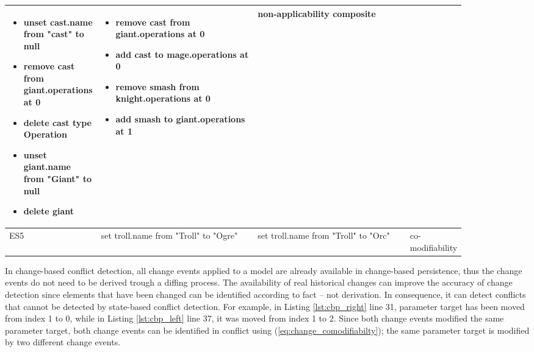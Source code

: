 \begin{table*}[ht]
\begin{scriptsize}
\begin{tabular}{|p{0.04\linewidth}|p{0.36\linewidth}|p{0.36\linewidth}|
        p{0.11\linewidth}|}
\begin{minipage}[t]{\linewidth}
        \raggedright
        \begin{itemize}[leftmargin=0pt]
          \setlength
          \item[] unset cast.name from "cast" to null
          \item[] remove cast from giant.operations at 0
          \item[] delete cast type Operation
          \item[] unset giant.name from "Giant" to null
          \item[] delete giant
        \end{itemize}
      \end{minipage}
      & 
      \begin{minipage}[t]{\linewidth}
        \raggedright
        \begin{itemize}[leftmargin=0pt]
          \setlength
          \item[] remove cast from giant.operations at 0
          \item[] add cast to mage.operations at 0
          \item[] remove smash from knight.operations at 0
          \item[] add smash to giant.operations at 1
        \end{itemize}
      \end{minipage}
      & 
      non-applicability composite\\
      \hline
      ES5 & 
      set troll.name from "Troll" to "Ogre" & 
      set troll.name from "Troll" to "Orc" & 
      co-modifiability\\ 
      \hline
    \end{tabular}
  \end{scriptsize}
\end{table*}



In change-based conflict detection, all change events applied to a model are already available in change-based persistence, thus the change events do not need to be derived trough a diffing process. The availability of real historical changes can improve the accuracy of change detection since elements that have been changed can be identified according to fact -- not derivation. In consequence, it can detect conflicts that cannot be detected by state-based conflict detection. For example, in Listing \ref{lst:cbp_right} line 31, parameter \textsf{target} has been moved from index 1 to 0, while in Listing \ref{lst:cbp_left} line 37, it was moved from index 1 to 2. Since both change events modified the same parameter \textsf{target}, both change events can be identified in conflict using (\ref{eq:change_comodifiabilty}); the same parameter \textsf{target} is modified by two different change events. 


